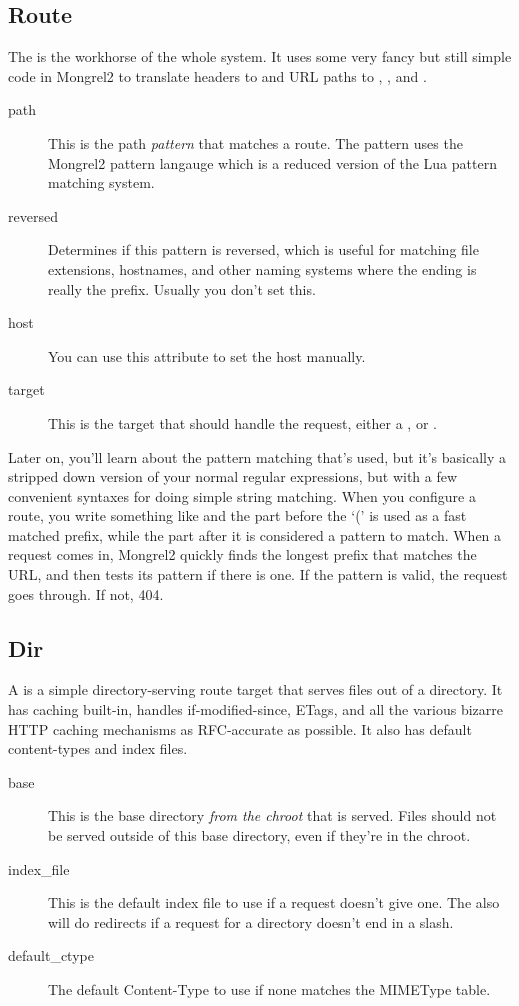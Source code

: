 \subsection{Route}

The  is the workhorse of the whole system.  It uses some very fancy but still simple
code in Mongrel2 to translate  headers to  and URL paths to ,
, and .

\begin{description}
\item[path] This is the path \emph{pattern} that matches a route.  The pattern uses the Mongrel2 pattern langauge
    which is a reduced version of the Lua pattern matching system.
\item[reversed] Determines if this pattern is reversed, which is useful for matching file extensions, hostnames,
    and other naming systems where the ending is really the prefix.  Usually you don't set this.
\item[host] You can use this attribute to set the host manually.
\item[target] This is the target that should handle the request, either a ,  or .
\end{description}

Later on, you'll learn about the pattern matching that's used, but it's basically a stripped down version of your
normal regular expressions, but with a few convenient syntaxes for doing simple string matching.  When you configure
a route, you write something like  and the part before the `(' is used as a fast matched
prefix, while the part after it is considered a pattern to match.  When a request comes in, Mongrel2 quickly finds the
longest prefix that matches the URL, and then tests its pattern if there is one.  If the pattern is valid, the
request goes through.  If not, 404.


\subsection{Dir}

A  is a simple directory-serving route target that serves files out of a directory.  It has caching
built-in, handles if-modified-since, ETags, and all the various bizarre HTTP caching mechanisms as RFC-accurate
as possible.  It also has default content-types and index files.

\begin{description}
\item[base]  This is the base directory \emph{from the chroot} that is served.  Files should not
    be served outside of this base directory, even if they're in the chroot.
\item[index\_file] This is the default index file to use if a request doesn't give one.  The 
    also will do redirects if a request for a directory doesn't end in a slash.
\item[default\_ctype] The default Content-Type to use if none matches the MIMEType table.
\end{description}

